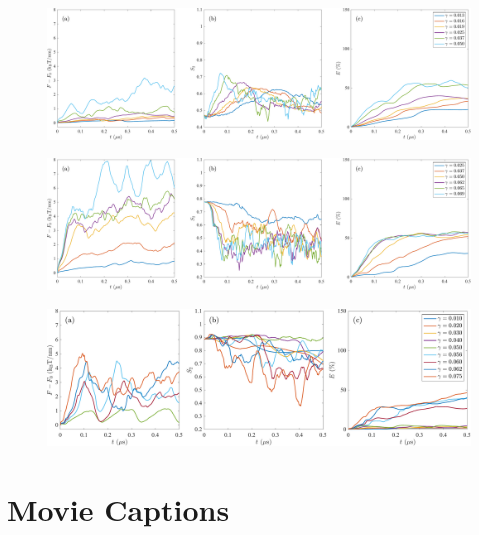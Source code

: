 \begin{figure}[h!]
\begin{center}
\includegraphics[width=\textwidth]{SMFigures/ULTGRaw.pdf}
\end{center}
\caption{}
\label{fig:ultgraw}
\end{figure}


\begin{figure}[h!]
\begin{center}
\includegraphics[width=\textwidth]{SMFigures/MLTGRaw.pdf}
\end{center}
\caption{}
\label{fig:mltgraw}
\end{figure}


\begin{figure}[h!]
\begin{center}
\includegraphics[width=\textwidth]{SMFigures/StTGRaw.pdf}
\end{center}
\caption{}
\label{fig:sttgraw}
\end{figure}

\sloppy
\section{Movie Captions}\mbox{} \\

